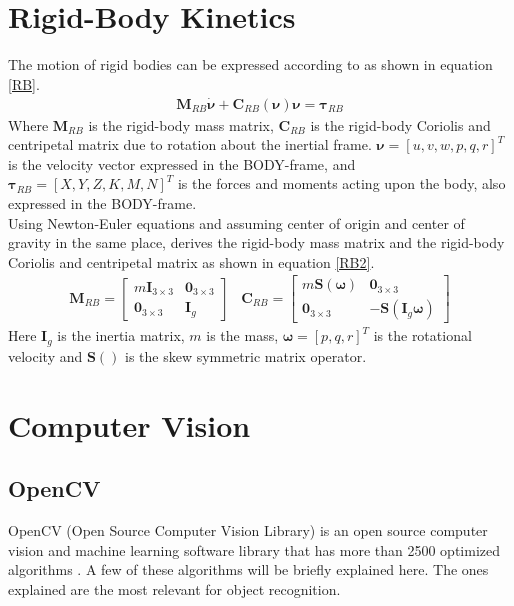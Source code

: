 \section{Rigid-Body Kinetics}
The motion of rigid bodies can be expressed according to \citep{Fossen} as shown in equation \ref{RB}.
\begin{eqnarray}
\boldsymbol{M}_{RB}\boldsymbol{\dot{\nu}} + \boldsymbol{C}_{RB}(\boldsymbol{\nu})\boldsymbol{\nu} = \boldsymbol{\tau}_{RB}
\label{RB}
\end{eqnarray}
Where $\boldsymbol{M}_{RB}$ is the rigid-body mass matrix, $\boldsymbol{C}_{RB}$ is the rigid-body Coriolis and centripetal matrix due to rotation about the inertial frame. $\boldsymbol{\nu} = [u, v, w, p, q, r]^T$ is the velocity vector expressed in the BODY-frame, and $\boldsymbol{\tau}_{RB} = [X, Y, Z, K, M, N]^T$ is the forces and moments acting upon the body, also expressed in the BODY-frame.\\
\newline
Using Newton-Euler equations and assuming center of origin and center of gravity in the same place, \citep{Fossen} derives the rigid-body mass matrix and the rigid-body Coriolis and centripetal matrix as shown in equation \ref{RB2}.
\begin{eqnarray}
\boldsymbol{M}_{RB} = \begin{bmatrix}
m\boldsymbol{I}_{3 \times 3} & \boldsymbol{0}_{3 \times 3} \\
\boldsymbol{0}_{3 \times 3} & \boldsymbol{I}_g
\end{bmatrix} \;\;\;
\boldsymbol{C}_{RB} = \begin{bmatrix}
m\boldsymbol{S}(\boldsymbol{\omega}) & \boldsymbol{0}_{3 \times 3}\\
\boldsymbol{0}_{3 \times 3} & -\boldsymbol{S}(\boldsymbol{I}_g\boldsymbol{\omega})
\end{bmatrix}
\label{RB2}
\end{eqnarray}
Here $\boldsymbol{I}_g$ is the inertia matrix, $m$ is the mass, $\boldsymbol{\omega} = [p, q, r]^T$  is the rotational velocity and $\boldsymbol{S}()$ is the skew symmetric matrix operator.
\section{Computer Vision}
\subsection{OpenCV}\label{opencv}
OpenCV (Open Source Computer Vision Library) is an open source computer vision and machine learning software library that has more than 2500 optimized algorithms \citep{opencv}. A few of these algorithms will be briefly explained here. The ones explained are the most relevant for object recognition.
